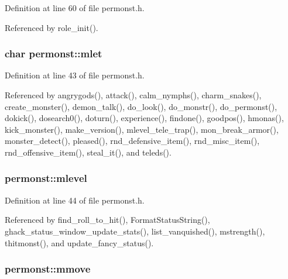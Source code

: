 Definition at line 60 of file permonst.\+h.



Referenced by role\+\_\+init().

\hypertarget{structpermonst_ab402dbf1bed9d0e595a2b3da6558da92}{
\subsubsection[{mlet}]{\setlength{\rightskip}{0pt plus 5cm}char permonst\+::mlet}}\label{structpermonst_ab402dbf1bed9d0e595a2b3da6558da92}


Definition at line 43 of file permonst.\+h.



Referenced by angrygods(), attack(), calm\+\_\+nymphs(), charm\+\_\+snakes(), create\+\_\+monster(), demon\+\_\+talk(), do\+\_\+look(), do\+\_\+monstr(), do\+\_\+permonst(), dokick(), dosearch0(), doturn(), experience(), findone(), goodpos(), hmonas(), kick\+\_\+monster(), make\+\_\+version(), mlevel\+\_\+tele\+\_\+trap(), mon\+\_\+break\+\_\+armor(), monster\+\_\+detect(), pleased(), rnd\+\_\+defensive\+\_\+item(), rnd\+\_\+misc\+\_\+item(), rnd\+\_\+offensive\+\_\+item(), steal\+\_\+it(), and teleds().

\hypertarget{structpermonst_aeed45d1ab54620bc7e5242b76f1c3c5f}{
\subsubsection[{mlevel}]{ permonst\+::mlevel}}\label{structpermonst_aeed45d1ab54620bc7e5242b76f1c3c5f}


Definition at line 44 of file permonst.\+h.



Referenced by find\+\_\+roll\+\_\+to\+\_\+hit(), Format\+Status\+String(), ghack\+\_\+status\+\_\+window\+\_\+update\+\_\+stats(), list\+\_\+vanquished(), mstrength(), thitmonst(), and update\+\_\+fancy\+\_\+status().

\hypertarget{structpermonst_a939712c539eb16cf6cb51e58ae1c12b0}{
\subsubsection[{mmove}]{ permonst\+::mmove}}\label{structpermonst_a939712c539eb16cf6cb51e58ae1c12b0}


